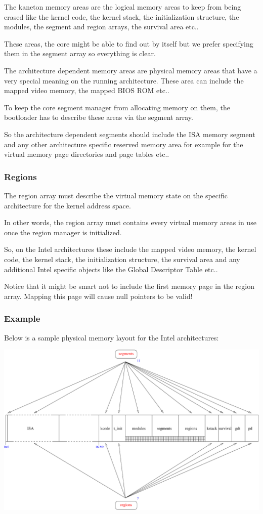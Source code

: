 The kaneton memory areas are the logical memory areas to keep from being
erased like the kernel code, the kernel stack, the initialization structure,
the modules, the segment and region arrays, the survival area etc..

These areas, the core might be able to find out by itself but we prefer
specifying them in the segment array so everything is clear.

The architecture dependent memory areas are physical memory areas that
have a very special meaning on the running architecture. These area can
include the mapped video memory, the mapped BIOS ROM etc..

To keep the core segment manager from allocating memory on them, the
bootloader has to describe these areas via the segment array.

So the architecture dependent segments should include the ISA memory segment
and any other architecture specific reserved memory area for example for
the virtual memory page directories and page tables etc..

\subsubsection{Regions}

The region array must describe the virtual memory state on the specific
architecture for the kernel address space.

In other words, the region array must contains every virtual memory
areas in use once the region manager is initialized.

So, on the Intel architectures these include the mapped video memory,
the kernel code, the kernel stack, the initialization structure, the
survival area and any additional Intel specific objects like the Global
Descriptor Table etc..

Notice that it might be smart not to include the first memory page in
the region array. Mapping this page will cause null pointers to be valid!

\subsubsection{Example}

Below is a sample physical memory layout for the Intel architectures:

\begin{center}
  \includegraphics[scale=0.7]{figures/k1-memory-layout.pdf}
\end{center}
